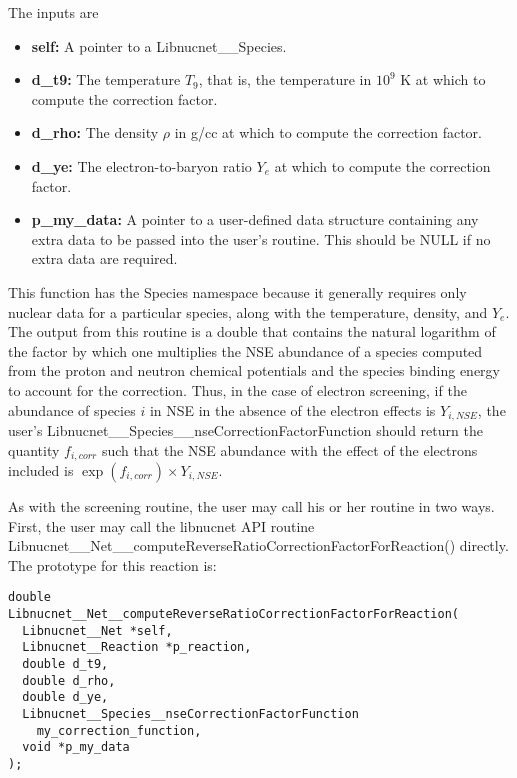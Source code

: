 \documentclass{article}    %
\begin{document}
The inputs are
\begin{itemize}

\item {\bf self:}  A pointer to a Libnucnet\_\_Species.

\item {\bf d\_t9:}  The temperature $T_9$, that is, the temperature
in $10^9$ K at which to compute the correction factor.

\item {\bf d\_rho:}  The density $\rho$ in g/cc at which to compute
the correction factor.

\item {\bf d\_ye:}  The electron-to-baryon ratio $Y_e$ at which to compute
the correction factor.

\item {\bf p\_my\_data:}  A pointer to a user-defined data structure
containing any extra data to be passed into the user's routine.  This should
be NULL if no extra data are required.

\end{itemize}

This function has the Species namespace because it generally
requires only nuclear data for a particular species, along with the temperature,
density, and $Y_e$.  The output from this
routine is a double that contains the natural logarithm of the
factor by which one multiplies the
NSE abundance of a species computed from the proton and neutron
chemical potentials and the species binding energy
to account for the correction.  Thus, in
the case of electron screening, if the
abundance of species $i$ in NSE in the absence of the electron effects is
$Y_{i,NSE}$, the user's
Libnucnet\_\_Species\_\_nseCorrectionFactorFunction
should return
the quantity $f_{i,corr}$ such that the NSE abundance with the effect of the
electrons included is $\exp(f_{i,corr}) \times Y_{i,NSE}$.

As with the screening routine, the user may call his or her routine in two
ways.  First, the user may call the libnucnet API routine\\
Libnucnet\_\_Net\_\_computeReverseRatioCorrectionFactorForReaction()
directly.  The prototype for this reaction is:

\begin{verbatim}
double
Libnucnet__Net__computeReverseRatioCorrectionFactorForReaction(
  Libnucnet__Net *self,
  Libnucnet__Reaction *p_reaction,
  double d_t9,
  double d_rho,
  double d_ye,
  Libnucnet__Species__nseCorrectionFactorFunction
    my_correction_function,
  void *p_my_data
);
\end{verbatim}
\end{document}
